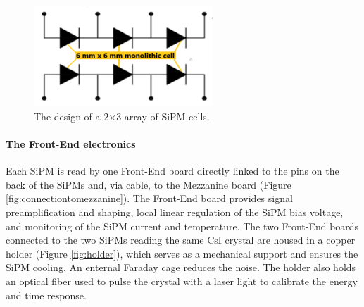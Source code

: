 \begin{figure}[!h]
    \centering
    \includegraphics[width =0.6\textwidth]{figures/png/Screenshot_20240706_141625.png}
    \caption[The design of SiPM cells.]{The design of a 2$\times$3 array of SiPM cells.}
    \label{fig:sipmcell}
\end{figure}
\paragraph{The Front-End electronics}
Each SiPM is read by one Front-End board directly linked to the pins on the 
back of the SiPMs and, via cable, to the Mezzanine board (Figure \ref{fig:connectiontomezzanine}). 
The Front-End board provides signal preamplification and shaping, local linear 
regulation of the SiPM bias voltage, and monitoring of the SiPM current and temperature. 
The two Front-End boards connected to the two SiPMs reading the same CsI 
crystal are housed in a copper holder (Figure \ref{fig:holder}), which 
serves as a mechanical support and ensures the SiPM cooling. 
An enternal Faraday cage reduces the noise. The holder also holds 
an optical fiber used to pulse the crystal with a laser light to 
calibrate the energy and time response.
